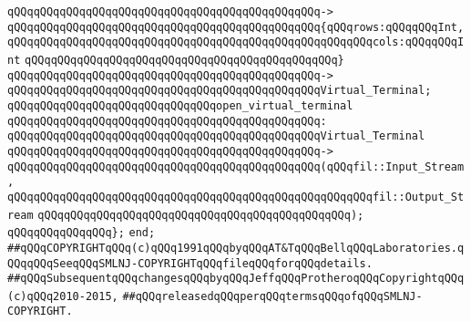 \verb|qQQqqQQqqQQqqQQqqQQqqQQqqQQqqQQqqQQqqQQqqQQqqQQq->|\newline
\verb|qQQqqQQqqQQqqQQqqQQqqQQqqQQqqQQqqQQqqQQqqQQqqQQq{qQQqrows:qQQqqQQqInt,|\newline
\verb|qQQqqQQqqQQqqQQqqQQqqQQqqQQqqQQqqQQqqQQqqQQqqQQqqQQqqQQqcols:qQQqqQQqInt|\newline
\verb|qQQqqQQqqQQqqQQqqQQqqQQqqQQqqQQqqQQqqQQqqQQqqQQq}|\newline
\verb|qQQqqQQqqQQqqQQqqQQqqQQqqQQqqQQqqQQqqQQqqQQqqQQq->|\newline
\verb|qQQqqQQqqQQqqQQqqQQqqQQqqQQqqQQqqQQqqQQqqQQqqQQqVirtual_Terminal;|\newline
\newline
\newline
\verb|qQQqqQQqqQQqqQQqqQQqqQQqqQQqqQQqopen_virtual_terminal|\newline
\verb|qQQqqQQqqQQqqQQqqQQqqQQqqQQqqQQqqQQqqQQqqQQqqQQq:|\newline
\verb|qQQqqQQqqQQqqQQqqQQqqQQqqQQqqQQqqQQqqQQqqQQqqQQqVirtual_Terminal|\newline
\verb|qQQqqQQqqQQqqQQqqQQqqQQqqQQqqQQqqQQqqQQqqQQqqQQq->|\newline
\verb|qQQqqQQqqQQqqQQqqQQqqQQqqQQqqQQqqQQqqQQqqQQqqQQq(qQQqfil::Input_Stream,|\newline
\verb|qQQqqQQqqQQqqQQqqQQqqQQqqQQqqQQqqQQqqQQqqQQqqQQqqQQqqQQqfil::Output_Stream|\newline
\verb|qQQqqQQqqQQqqQQqqQQqqQQqqQQqqQQqqQQqqQQqqQQqqQQq);|\newline
\verb|qQQqqQQqqQQqqQQq};|\newline
\newline
\verb|end;|\newline
\newline
\newline
\verb|##qQQqCOPYRIGHTqQQq(c)qQQq1991qQQqbyqQQqAT&TqQQqBellqQQqLaboratories.qQQqqQQqSeeqQQqSMLNJ-COPYRIGHTqQQqfileqQQqforqQQqdetails.|\newline
\verb|##qQQqSubsequentqQQqchangesqQQqbyqQQqJeffqQQqProtheroqQQqCopyrightqQQq(c)qQQq2010-2015,|\newline
\verb|##qQQqreleasedqQQqperqQQqtermsqQQqofqQQqSMLNJ-COPYRIGHT.|\newline

